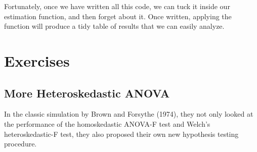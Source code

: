 \documentclass[
]{book}
\newenvironment{Shaded}{\begin{snugshade}}{\end{snugshade}}
\newcommand{\CommentTok}[1]{\textcolor[rgb]{0.56,0.35,0.01}{\textit{#1}}}
\newcommand{\ConstantTok}[1]{\textcolor[rgb]{0.56,0.35,0.01}{#1}}
\newcommand{\ControlFlowTok}[1]{\textcolor[rgb]{0.13,0.29,0.53}{\textbf{#1}}}
\newcommand{\FunctionTok}[1]{\textcolor[rgb]{0.13,0.29,0.53}{\textbf{#1}}}
\newcommand{\NormalTok}[1]{#1}
\newcommand{\OtherTok}[1]{\textcolor[rgb]{0.56,0.35,0.01}{#1}}
\newcommand{\SpecialCharTok}[1]{\textcolor[rgb]{0.81,0.36,0.00}{\textbf{#1}}}
\begin{document}
\begin{Shaded}
\end{Shaded}

Fortunately, once we have written all this code, we can tuck it inside our estimation function, and then forget about it.
Once written, applying the function will produce a tidy table of results that we can easily analyze.

\section{Exercises}\label{exercises-4}

\subsection{More Heteroskedastic ANOVA}\label{BFFs-forever}

In the classic simulation by Brown and Forsythe (1974), they not only looked at the performance of the homoskedastic ANOVA-F test and Welch's heteroskedastic-F test, they also proposed their own new hypothesis testing procedure.
\end{document}
